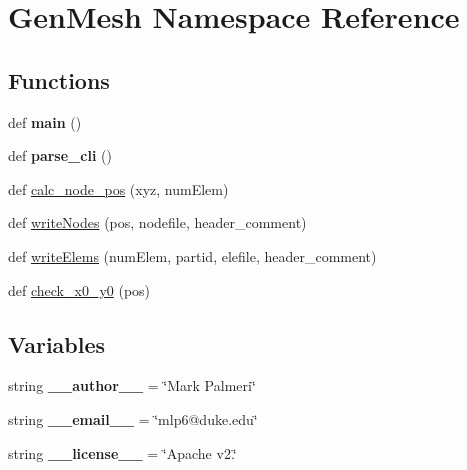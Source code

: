 \hypertarget{namespaceGenMesh}{}\section{Gen\+Mesh Namespace Reference}
\label{namespaceGenMesh}
\subsection*{Functions}
\begin{DoxyCompactItemize}
\item 
\hypertarget{namespaceGenMesh_af11a4af1dd3bdcb8b0d3486683758812}{}def {\bfseries main} ()\label{namespaceGenMesh_af11a4af1dd3bdcb8b0d3486683758812}

\item 
\hypertarget{namespaceGenMesh_a9a4c1f381fb4677f8dd50787b44db625}{}def {\bfseries parse\+\_\+cli} ()\label{namespaceGenMesh_a9a4c1f381fb4677f8dd50787b44db625}

\item 
def \hyperlink{namespaceGenMesh_abc935a1e9a6644479bb396c552badb4a}{calc\+\_\+node\+\_\+pos} (xyz, num\+Elem)
\item 
def \hyperlink{namespaceGenMesh_aa43424591af5f0d1524b446ac2b394d1}{write\+Nodes} (pos, nodefile, header\+\_\+comment)
\item 
def \hyperlink{namespaceGenMesh_a3aca926178f852fdb02618a5a299681d}{write\+Elems} (num\+Elem, partid, elefile, header\+\_\+comment)
\item 
def \hyperlink{namespaceGenMesh_a3f0064bed0a30d98493d7924919e6468}{check\+\_\+x0\+\_\+y0} (pos)
\end{DoxyCompactItemize}
\subsection*{Variables}
\begin{DoxyCompactItemize}
\item 
\hypertarget{namespaceGenMesh_ae72bab920317d34184cbb5299b5f8105}{}string {\bfseries \+\_\+\+\_\+author\+\_\+\+\_\+} = \char`\"{}Mark Palmeri\char`\"{}\label{namespaceGenMesh_ae72bab920317d34184cbb5299b5f8105}

\item 
\hypertarget{namespaceGenMesh_a0d6434d536da6f76b95e6c47f8399d32}{}string {\bfseries \+\_\+\+\_\+email\+\_\+\+\_\+} = \char`\"{}mlp6@duke.\+edu\char`\"{}\label{namespaceGenMesh_a0d6434d536da6f76b95e6c47f8399d32}

\item 
\hypertarget{namespaceGenMesh_a2098deb4051637a89446d6660704ff62}{}string {\bfseries \+\_\+\+\_\+license\+\_\+\+\_\+} = \char`\"{}Apache v2.\char`\"{}\label{namespaceGenMesh_a2098deb4051637a89446d6660704ff62}

\end{DoxyCompactItemize}


